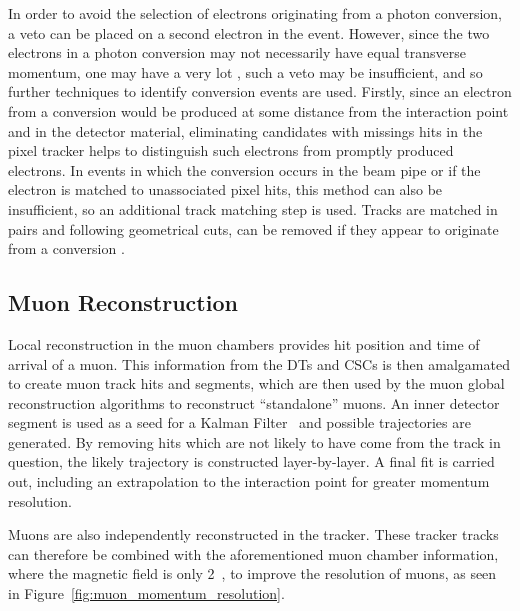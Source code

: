 In order to avoid the selection of electrons originating from a photon conversion, a veto can be placed on a
second electron in the event. However, since the two electrons in a photon conversion may not necessarily have
equal transverse momentum, \ie one may have a very lot \pt, such a veto may be insufficient, and so further
techniques to identify conversion events are used. Firstly, since an electron from a conversion would be produced at some distance from the
interaction point and in the detector material, eliminating candidates with missings hits in the pixel tracker
helps to distinguish such electrons from promptly produced electrons. In events in which the conversion occurs
in the beam pipe or if the electron is matched to unassociated pixel hits, this method can also be
insufficient, so an additional track matching step is used. Tracks are matched in pairs and following
geometrical cuts, can be removed if they appear to originate from a conversion \cite{electron_reconstruction}.

\subsection{Muon Reconstruction}
\label{ss:muon_reconstruction}
Local reconstruction in the muon chambers provides hit position and time of arrival of a muon. This
information from the DTs and CSCs is then amalgamated to create muon track hits and segments, which are then
used by the muon global reconstruction algorithms to reconstruct ``standalone'' muons. An inner detector
segment is used as a seed for a Kalman Filter~\cite{kalman_filter, Speer:927395} and possible trajectories are
generated. By removing hits which are not likely to have come from the track in question, the likely
trajectory is constructed layer-by-layer. A final fit is carried out, including an extrapolation to the
interaction point for greater momentum resolution.

Muons are also independently reconstructed in the tracker. These tracker tracks can therefore be combined with
the aforementioned muon chamber information, where the magnetic field is only 2~\tesla, to improve the \pt
resolution of muons, as seen in Figure~\ref{fig:muon_momentum_resolution}.

